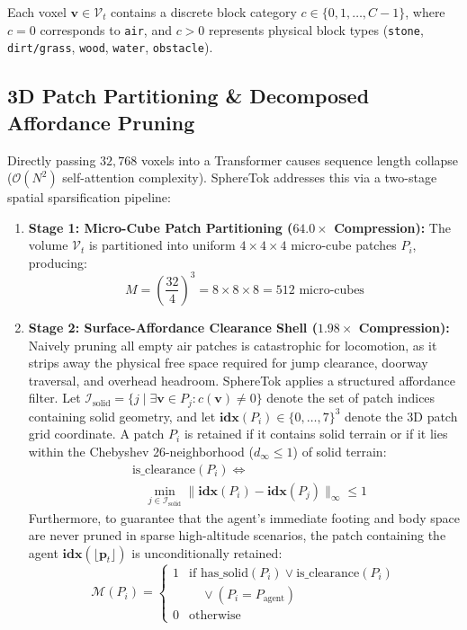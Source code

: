 \documentclass[10pt,twocolumn,letterpaper]{article}
\begin{document}
Each voxel $\mathbf{v} \in \mathcal{V}_t$ contains a discrete block category $c \in \{0, 1, \dots, C-1\}$, where $c = 0$ corresponds to \texttt{air}, and $c > 0$ represents physical block types (\texttt{stone}, \texttt{dirt/grass}, \texttt{wood}, \texttt{water}, \texttt{obstacle}).

\subsection{3D Patch Partitioning \& Decomposed Affordance Pruning}
Directly passing $32,768$ voxels into a Transformer causes sequence length collapse ($\mathcal{O}(N^2)$ self-attention complexity). SphereTok addresses this via a two-stage spatial sparsification pipeline:

\begin{enumerate}[leftmargin=*]
    \item \textbf{Stage 1: Micro-Cube Patch Partitioning ($64.0\times$ Compression):} The volume $\mathcal{V}_t$ is partitioned into uniform $4 \times 4 \times 4$ micro-cube patches $P_i$, producing:
    \begin{equation}
    M = \left(\frac{32}{4}\right)^3 = 8 \times 8 \times 8 = 512 \text{ micro-cubes}
    \end{equation}

    \item \textbf{Stage 2: Surface-Affordance Clearance Shell ($1.98\times$ Compression):} Naively pruning all empty air patches is catastrophic for locomotion, as it strips away the physical free space required for jump clearance, doorway traversal, and overhead headroom. SphereTok applies a structured affordance filter. Let $\mathcal{I}_{\text{solid}} = \{ j \mid \exists \mathbf{v} \in P_j : c(\mathbf{v}) \neq 0 \}$ denote the set of patch indices containing solid geometry, and let $\mathbf{idx}(P_i) \in \{0, \dots, 7\}^3$ denote the 3D patch grid coordinate. A patch $P_i$ is retained if it contains solid terrain or if it lies within the Chebyshev 26-neighborhood ($d_\infty \leq 1$) of solid terrain:
    \begin{align}
    &\text{is\_clearance}(P_i) \iff \nonumber \\
    &\quad \min_{j \in \mathcal{I}_{\text{solid}}} \| \mathbf{idx}(P_i) - \mathbf{idx}(P_j) \|_\infty \leq 1
    \end{align}
    Furthermore, to guarantee that the agent’s immediate footing and body space are never pruned in sparse high-altitude scenarios, the patch containing the agent $\mathbf{idx}(\lfloor\mathbf{p}_t\rfloor)$ is unconditionally retained:
    \begin{equation}
    \mathcal{M}(P_i) = \begin{cases} 
    1 & \text{if } \text{has\_solid}(P_i) \lor \text{is\_clearance}(P_i) \\
      & \quad \lor (P_i = P_{\text{agent}}) \\ 
    0 & \text{otherwise} 
    \end{cases}
    \end{equation}
\end{enumerate}
\end{document}
